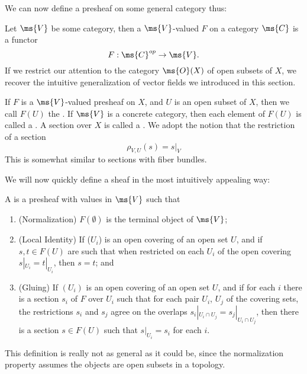 We can now define a presheaf on some general category thus:
\begin{defn}\label{defn:presheaf}
Let $\ms{V}$ be some category, then a $\ms{V}$-valued
 $F$ on a category $\ms{C}$ is a functor
\begin{equation}%
F:\ms{C}^{op}\to\ms{V}.
\end{equation}
If we restrict our attention to the category $\ms{O}(X)$ of open
subsets of $X$, we recover the intuitive generalization of vector
fields we introduced in this section.
\end{defn}
\begin{comment}
\begin{rmk}
A presheaf with consistency on overlaps is precisely a sheaf. We
are uninterested in such things for several reasons. First, it
would be an insult to dedicated a few meager paragraphs to the
subject when it deserves a book in its own right. Second, we can
do a number of nifty things with presheaves in category theory,
which is all we care about at the moment.
\end{rmk}
\end{comment}

If $F$ is a $\ms{V}$-valued presheaf on $X$, and $U$ is an open
subset of $X$, then we call $F(U)$ the . If $\ms{V}$ is a concrete category, then each
element of $F(U)$ is called a . A section over
$X$ is called a . We adopt the notion that
the restriction of a section
\begin{equation}%
\rho_{V,U}(s)=s|_{V}
\end{equation}
This is somewhat similar to sections with fiber bundles.

We will now quickly define a sheaf in the most intuitively appealing
way:
\begin{defn}\label{defn:sheaf}
A  is a
presheaf with values in $\ms{V}$ such that
\begin{enumerate}
\item{(Normalization)} $F(\emptyset)$ is the terminal object of
  $\ms{V}$;
\item{(Local Identity)} If ($U_i$) is an open covering of an open
set $U$, and if $s,t\in F(U)$ are such that when restricted on
each $U_i$ of the open covering $s|_{U_i}=t|_{U_i}$, then $s=t$;
and
\item{(Gluing)} If $(U_i)$ is an open covering of an open set
  $U$, and if for each $i$ there is a section $s_i$ of $F$ over
  $U_i$ such that for each pair $U_i$, $U_j$ of the covering
  sets, the restrictions $s_i$ and $s_j$ agree on the overlaps
  $s_{i}|_{U_{i}\cap U_{j}}=s_{j}|_{U_{i}\cap U_{j}}$, then there
  is a section $s\in F(U)$ such that $s|_{U_i}=s_i$ for each $i$.
\end{enumerate}
\end{defn}
This definition is really not as general as it could be, since
the normalization property assumes the objects are open subsets
in a topology.

